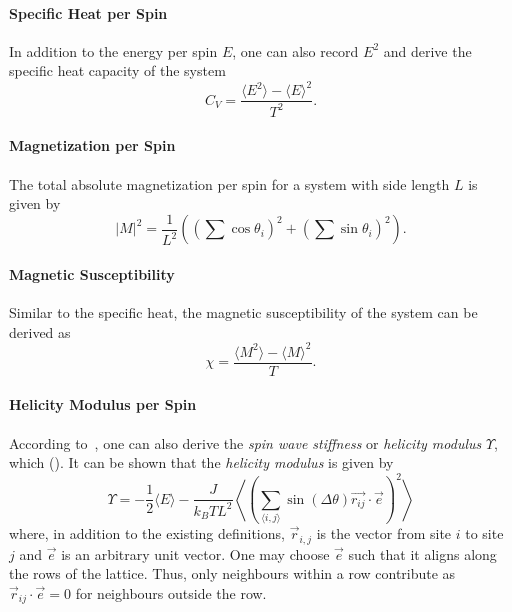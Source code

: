 		\paragraph{Specific Heat per Spin}
			In addition to the energy per spin $E$, one can also record $E^2$ and derive the specific heat capacity of the system
			\begin{equation}\label{eq:specific_heat}
				C_V = \frac{\langle E^2 \rangle - \langle E \rangle^2}{T^2}.
			\end{equation}
		
		\paragraph{Magnetization per Spin}
			The total absolute magnetization per spin for a system with side length $L$ is given by
			\begin{equation}\label{eq:magnetization}
				\lvert M \rvert^2 = \frac{1}{L^2} \left( (\sum{\cos\theta_i})^2 + (\sum{\sin\theta_i})^2 \right).
			\end{equation}
		
		\paragraph{Magnetic Susceptibility}
			Similar to the specific heat, the magnetic susceptibility of the system can be derived as
			\begin{equation}\label{eq:magnetic_suceptibility}
				\chi = \frac{\langle M^2 \rangle - \langle M \rangle^2}{T}.
			\end{equation}
		
		\paragraph{Helicity Modulus per Spin}
			According to~\cite{teitel_helicity}, one can also derive the \emph{spin wave stiffness} or \emph{helicity modulus} $\Upsilon$, which  (\cite{teitel_helicity}). It can be shown that the \emph{helicity modulus} is given by
			\begin{equation}\label{eq:helicity_modulus}
				\Upsilon = -\frac{1}{2} \langle E \rangle - \frac{J}{k_B T L^2} \left\langle \left(\sum_{\langle i,j \rangle}{\sin(\Delta \theta) \vec{r_{ij}} \cdot \vec{e}}\right)^2 \right\rangle
			\end{equation}
			\cite[eq. 3.2]{teitel_helicity} where, in addition to the existing definitions, $\vec{r}_{i,j}$ is the vector from site $i$ to site $j$ and $\vec{e}$ is an arbitrary unit vector. One may choose $\vec{e}$ such that it aligns along the rows of the lattice. Thus, only neighbours within a row contribute as $\vec{r}_{ij} \cdot \vec{e} = 0$ for neighbours outside the row.
	
